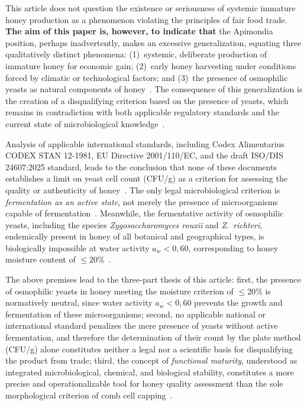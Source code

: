 This article does not question the existence or seriousness of
systemic immature honey production as a phenomenon violating the
principles of fair food trade. \textbf{The aim of this paper is,
however, to indicate that} the Apimondia position, perhaps
inadvertently, makes an excessive generalization, equating three
qualitatively distinct phenomena:
(1)~systemic, deliberate production of immature honey for economic
gain; (2)~early honey harvesting under conditions forced by climatic
or technological factors; and (3)~the presence of osmophilic yeasts
as natural components of honey~\cite{garcia2025,munitis1976}.
The consequence of this generalization is the creation of a
disqualifying criterion based on the presence of yeasts, which
remains in contradiction with both applicable regulatory standards
and the current state of microbiological
knowledge~\cite{codex_stan12, rodriguezmachado2024}.

Analysis of applicable international standards, including Codex
Alimentarius CODEX STAN 12-1981, EU Directive 2001/110/EC, and the
draft ISO/DIS 24607:2025 standard, leads to the conclusion that
none of these documents establishes a limit on yeast cell count
(CFU/g) as a criterion for assessing the quality or authenticity of
honey~\cite{codex_stan12}.
The only legal microbiological criterion is \emph{fermentation as an
active state}, not merely the presence of microorganisms capable of
fermentation~\cite{codex_stan12}.
Meanwhile, the fermentative activity of osmophilic yeasts, including
the species \textit{Zygosaccharomyces rouxii} and \textit{Z.~richteri},
endemically present in honey of all botanical and geographical types,
is biologically impossible at water activity $a_w < 0{,}60$,
corresponding to honey moisture content of $\leq 20\%$~\cite{zamora2006}.

The above premises lead to the three-part thesis of this article:
first, the presence of osmophilic yeasts in honey meeting the moisture
criterion of $\leq 20\%$ is normatively neutral, since water activity
$a_w < 0{,}60$ prevents the growth and fermentation of these
microorganisms; second, no applicable national or international
standard penalizes the mere presence of yeasts without active
fermentation, and therefore the determination of their count by the
plate method (CFU/g) alone constitutes neither a legal nor a scientific
basis for disqualifying the product from trade; third, the concept of
\emph{functional maturity}, understood as integrated microbiological,
chemical, and biological stability, constitutes a more precise and
operationalizable tool for honey quality assessment than the sole
morphological criterion of comb cell
capping~\cite{zhang2021,guo2020,sun2021}.


